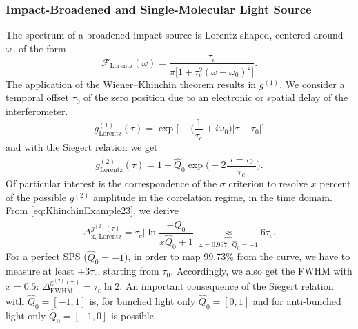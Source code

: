 \subsubsection{Impact-Broadened and Single-Molecular Light Source}\label{sec:Impact}
The spectrum of a broadened impact source is Lorentz-shaped, centered around $\omega_0$ \cite{fox_quantum_2006} of the form
\begin{equation}\label{eq:KhinchinExample21}
	\mathcal{F}_\mathrm{Lorentz}(\omega)=\dfrac{\tau_c}{\pi\big[1+\tau^2_c(\omega-\omega_0)^2\big]}.
\end{equation}
The application of the Wiener--Khinchin theorem results in $g^{(1)}$. We consider a temporal offset $\tau_0$ of the zero position due to an electronic or spatial delay of the interferometer.
\begin{equation}\label{eq:KhinchinExample22}
	g^{(1)}_\mathrm{Lorentz}(\tau)=\exp{\Big[-\Big(\dfrac{1}{\tau_c}+i\omega_0\Big)\big|\tau-\tau_0\big|\Big]}
\end{equation}
and with the Siegert relation we get
\begin{equation}\label{eq:KhinchinExample23}
	g^{(2)}_\mathrm{Lorentz}(\tau) = 1 + \hat{Q}_0\exp\Big(-2\dfrac{|\tau-\tau_0|}{\tau_c}\Big).
\end{equation}
Of particular interest is the correspondence of the $\sigma$ criterion to resolve $x$ percent of the possible $g^{(2)}$ amplitude in the correlation regime, in the time domain. From \cref{eq:KhinchinExample23}, we derive
\begin{equation}\label{eq:FWHMtauLorentz}
	\Delta_\mathrm{x,\, Lorentz}^{g^{(2)}(\tau)}=\tau_c\Big|\ln{\dfrac{-\hat{Q}_0}{x\hat{Q}_0+1}}\Big|\underbracket{\approx}_{\mathrm{x=0.997,\;\hat{Q}_0=-1}}6\tau_c.
\end{equation}
For a perfect \ac{SPS} ($\hat{Q}_0=-1$), in order to map 99.73\% from the curve, we have to measure at least $\pm3\tau_c$, starting from $\tau_0$.
Accordingly, we also get the \ac{FWHM} with $x=0.5$: $\Delta_\mathrm{FWHM,}^\mathrm{g^{(2)}(\tau)}=\tau_c\ln{2}$.\newline
An important consequence of the Siegert relation with $\hat{Q}_0=[-1,1]$ is, for bunched light only $\hat{Q}_0=[0,1]$ and for anti-bunched light only $\hat{Q}_0=[-1,0]$ is possible.

